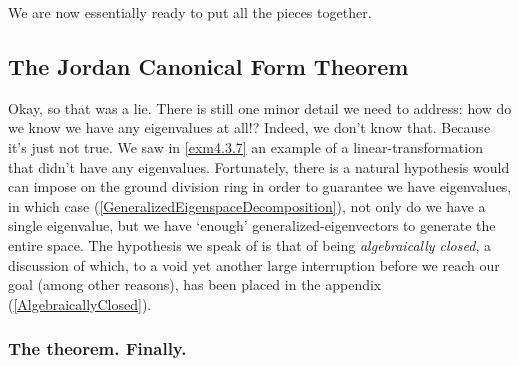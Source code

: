 We are now essentially ready to put all the pieces together.

\subsection{The Jordan Canonical Form Theorem}

Okay, so that was a lie.  There is still one minor detail we need to address:  how do we know we have any eigenvalues at all!?  Indeed, we don't know that.  Because it's just not true.  We saw in \cref{exm4.3.7} an example of a linear-transformation that didn't have any eigenvalues.  Fortunately, there is a natural hypothesis would can impose on the ground division ring in order to guarantee we have eigenvalues, in which case (\cref{GeneralizedEigenspaceDecomposition}), not only do we have a single eigenvalue, but we have `enough' generalized-eigenvectors to generate the entire space.  The hypothesis we speak of is that of being \emph{algebraically closed}, a discussion of which, to a void yet another large interruption before we reach our goal (among other reasons), has been placed in the appendix (\cref{AlgebraicallyClosed}).

\subsubsection{The theorem.  Finally.}

